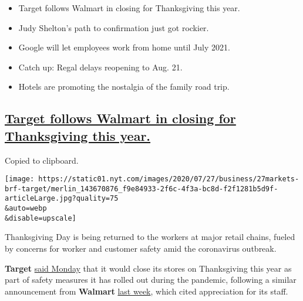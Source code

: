 \begin{itemize}
\item
  \protect\hyperlink{target-thanksgiving}{}

  Target follows Walmart in closing for Thanksgiving this year.
\item
  \protect\hyperlink{judy-sheltons-path-to-confirmation-just-got-rockier}{}

  Judy Shelton's path to confirmation just got rockier.
\item
  \protect\hyperlink{google-will-let-employees-work-from-home-until-july-2021}{}

  Google will let employees work from home until July 2021.
\item
  \protect\hyperlink{catch-up-regal-delays-reopening-to-aug-21}{}

  Catch up: Regal delays reopening to Aug. 21.
\item
  \protect\hyperlink{hotels-are-promoting-the-nostalgia-of-the-family-road-trip}{}

  Hotels are promoting the nostalgia of the family road trip.
\end{itemize}

\hypertarget{target-follows-walmart-in-closing-for-thanksgiving-this-year}{%
\subsection{\texorpdfstring{\protect\hyperlink{target-thanksgiving}{Target
follows Walmart in closing for Thanksgiving this
year.}}{Target follows Walmart in closing for Thanksgiving this year.}}\label{target-follows-walmart-in-closing-for-thanksgiving-this-year}}

Copied to clipboard.

\texttt{[image: https://static01.nyt.com/images/2020/07/27/business/27markets-brf-target/merlin\_143670876\_f9e84933-2f6c-4f3a-bc8d-f2f1281b5d9f-articleLarge.jpg?quality=75\\\&auto=webp\\\&disable=upscale]}

Thanksgiving Day is being returned to the workers at major retail
chains, fueled by concerns for worker and customer safety amid the
coronavirus outbreak.

\textbf{Target}
\href{https://corporate.target.com/article/2020/07/early-holiday-plans}{said
Monday} that it would close its stores on Thanksgiving this year as part
of safety measures it has rolled out during the pandemic, following a
similar announcement from \textbf{Walmart}
\href{https://www.nytimes.com/live/2020/07/21/business/stock-market-today-coronavirus\#walmart-will-close-on-thanksgiving-day}{last
week}, which cited appreciation for its staff.

